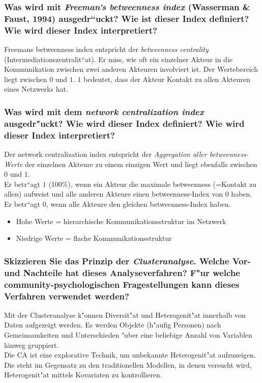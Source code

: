 \subsubsection{Was wird mit \emph{Freeman’s betweenness index} (Wasserman \& Faust, 1994) ausgedr“uckt? Wie ist dieser Index definiert? Wie wird dieser Index interpretiert?}
Freemans betweenness index entspricht der \emph{betweenness centrality} (Intermediationszentralit“at). Er miss, wie oft ein einzelner Akteur in die Kommunikation zwischen zwei anderen Akteuren involviert ist. Der Wertebereich liegt zwischen $0$ und $1$. $1$ bedeutet, dass der Akteur Kontakt zu allen Akteuren eines Netzwerks hat. 

\subsubsection{Was wird mit dem \emph{network centralization index} ausgedr"uckt? Wie wird dieser Index definiert? Wie wird dieser Index interpretiert?}
Der network centralization index entspricht der \emph{Aggregation aller betweenness-Werte} der einzelnen Akteure zu einem einzigen Wert und liegt ebenfalls zwischen $0$ und $1$.\\ 
Er betr“agt $1$ (100\%), wenn ein Akteur die maximale betweenness (=Kontakt zu allen) aufweist und alle anderen Akteure einen betweenness-Index von $0$ haben.\\
Er betr“agt $0$, wenn alle Akteure den gleichen betweenness-Index haben.
\begin{itemize}
  \item Hohe Werte = hierarchische Kommunikationsstruktur im Netzwerk
  \item Niedrige Werte = flache Kommunikationsstruktur
\end{itemize}

\subsubsection{Skizzieren Sie das Prinzip der \emph{Clusteranalyse}. Welche Vor- und Nachteile hat dieses Analyseverfahren? F"ur welche community-psychologischen Fragestellungen kann dieses Verfahren verwendet werden?}
Mit der Clusteranalyse k"onnen Diversit"at und Heterogenit"at innerhalb von Daten aufgezeigt werden. Es werden Objekte (h"aufig Personen) nach Gemeinsamkeiten und Unterschieden "uber eine beliebige Anzahl von Variablen hinweg gruppiert.\\
Die CA ist eine explorative Technik, um unbekannte Heterogenit"at aufzuzeigen. Die steht im Gegensatz zu den traditionellen Modellen, in denen versucht wird, Heterogenit"at mittels Kovariaten zu kontrollieren.


